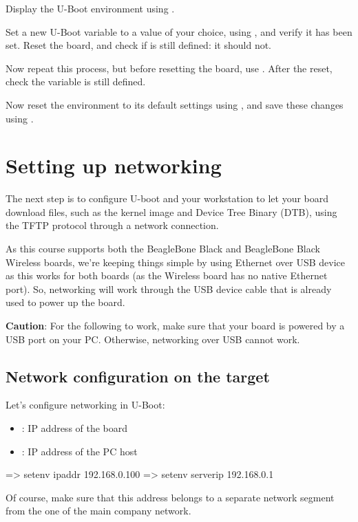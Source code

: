 Display the U-Boot environment using .

Set a new U-Boot variable  to a value of your choice, using
, and verify it has been set. Reset the board, and check
if  is still defined: it should not.

Now repeat this process, but before resetting the board, use
. After the reset, check the  variable is
still defined.

Now reset the environment to its default settings using , and save these changes using .

\section{Setting up networking}

The next step is to configure U-boot and your workstation to let your
board download files, such as the kernel image and Device Tree Binary
(DTB), using the TFTP protocol through a network connection.

As this course supports both the BeagleBone Black and BeagleBone Black
Wireless boards, we're keeping things simple by using Ethernet over USB
device as this works for both boards (as the Wireless board has no
native Ethernet port). So, networking will work through the USB device
cable that is already used to power up the board.

{\bf Caution}: For the following to work, make sure that your board
is powered by a USB port on your PC. Otherwise, networking over USB
cannot work.

\subsection{Network configuration on the target}

Let's configure networking in U-Boot:

\begin{itemize}
  \item {}: IP address of the board
  \item {}: IP address of the PC host
\end{itemize}

\begin{ubootinput}
=> setenv ipaddr 192.168.0.100
=> setenv serverip 192.168.0.1
\end{ubootinput}

Of course, make sure that this address belongs to a separate network
segment from the one of the main company network.

